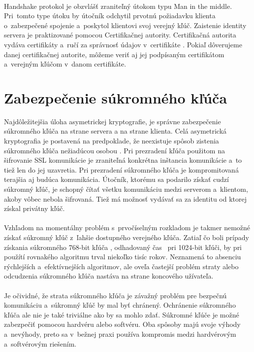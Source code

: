 \documentclass[
  digital, %
  table,   %
oneside,
  nolof,     %
  nolot,     %
]{fithesis3}
\begin{document}
\paragraph{}
Handshake protokol je obzvlášť zraniteľný  útokom typu Man in the middle. Pri~tomto type útoku by útočník odchytil prvotnú požiadavku klienta o~zabezpečené spojenie a~poskytol klientovi svoj verejný kľúč. Zaistenie identity servera je praktizované pomocou Certifikačnej autority.  Certifikačná autorita vydáva certifikáty a~ručí za správnosť údajov v~certifikáte \cite{certificateAuth}. Pokiaľ dôverujeme danej certifikačnej autorite, môžeme veriť aj jej podpísaným certifikátom  a~verejným kľúčom v~danom certifikáte. 
\section{Zabezpečenie súkromného kľúča }
Najdôležitejšia úloha asymetrickej kryptografie, je správne zabezpečenie súkromného kľúča na strane servera a na strane klienta.
Celá asymetrická kryptografia je postavená na predpoklade, že neexistuje spôsob zistenia súkromného kľúča nežiadúcou osobou \cite{ssl}. 
Pri prezradení kľúča použitom na šifrovanie SSL komunikácie je zraniteľná konkrétna inštancia komunikácie a~to tiež len do jej uzavretia. Pri prezradení súkromného kľúča je kompromitovaná terajšia aj budúca komunikácia. Útočník, ktorému sa podarilo získať cudzí súkromný kľúč, je schopný čítať všetku komunikáciu medzi serverom a~klientom, akoby vôbec nebola šifrovaná. Tiež má možnosť vydávať sa za identitu od ktorej získal privátny kľúč.\paragraph{}
Vzhľadom na momentálny problém s~prvočíselným rozkladom je takmer nemožné získať súkromný kľúč z~ľahšie dostupného verejného kľúča. Zatiaľ čo boli prípady získania súkromného 768-bit kľúča \cite{crypt768}, odhadovaný čas~ pri 1024-bit kľúči, by pri  použítí rovnakého algoritmu trval niekoľko tisíc rokov. Neznamená to absenciu rýchlejších a~efektívnejších algoritmov, ale oveľa častejší problém straty alebo odcudzenia súkromného kľúča nastáva na strane koncového užívateľa.\paragraph{}
Je očividné, že strata súkromného kľúča je závažný problém pre bezpečnú komunikáciu a~súkromný kľúč by mal byť chránený. Ochránenie súkromného kľúča ale nie je také triviálne ako by sa mohlo zdať. Súkromné kľúče je možné zabezpečiť pomocou hardvéru alebo softvéru. Oba spôsoby majú svoje výhody a~nevýhody, preto sa  v~bežnej praxi používa kompromis medzi hardvérovým a~softvérovým riešením.
\end{document}
